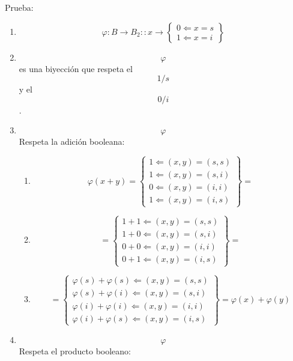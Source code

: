 \begin{enumerate}
\begin{enumerate}
\begin{enumerate}
      Prueba:

      \begin{enumerate}
      \def\labelenumiv{\arabic{enumiv}.}
      \item
        \[\varphi:{B\rightarrow B_{2}}::{x\rightarrow\begin{Bmatrix}
        {0\Leftarrow{x = s}} \\
        {1\Leftarrow{x = i}}
        \end{Bmatrix}}\]
      \item
        \[\varphi\]es una biyección que respeta el \[1/s\] y el \[0/i\].
      \item
        \[\varphi\]Respeta la adición booleana:

        \begin{enumerate}
        \def\labelenumv{\arabic{enumv}.}
        \tightlist
        \item
          \[\varphi{{{({x + y})} = \begin{Bmatrix}
          {1\Leftarrow{{({x,y})} = {({s,s})}}} \\
          {1\Leftarrow{{({x,y})} = {({s,i})}}} \\
          {0\Leftarrow{{({x,y})} = {({i,i})}}} \\
          {1\Leftarrow{{({x,y})} = {({i,s})}}}
          \end{Bmatrix}} =}\]
        \item
          \[{= \begin{Bmatrix}
          {{1 + 1}\Leftarrow{{({x,y})} = {({s,s})}}} \\
          {{1 + 0}\Leftarrow{{({x,y})} = {({s,i})}}} \\
          {{0 + 0}\Leftarrow{{({x,y})} = {({i,i})}}} \\
          {{0 + 1}\Leftarrow{{({x,y})} = {({i,s})}}}
          \end{Bmatrix}} =\]
        \item
          \[{{= \begin{Bmatrix}
          {\varphi{{(s)} + \varphi}{(s)}\Leftarrow{{({x,y})} = {({s,s})}}} \\
          {\varphi{{(s)} + \varphi}{(i)}\Leftarrow{{({x,y})} = {({s,i})}}} \\
          {\varphi{{(i)} + \varphi}{(i)}\Leftarrow{{({x,y})} = {({i,i})}}} \\
          {\varphi{{(i)} + \varphi}{(s)}\Leftarrow{{({x,y})} = {({i,s})}}}
          \end{Bmatrix}} = \varphi}{{(x)} + \varphi}{(y)}\]
        \end{enumerate}
      \item
        \[\varphi\]Respeta el producto booleano:


\end{enumerate}
\end{enumerate}
\end{enumerate}
\end{enumerate}
